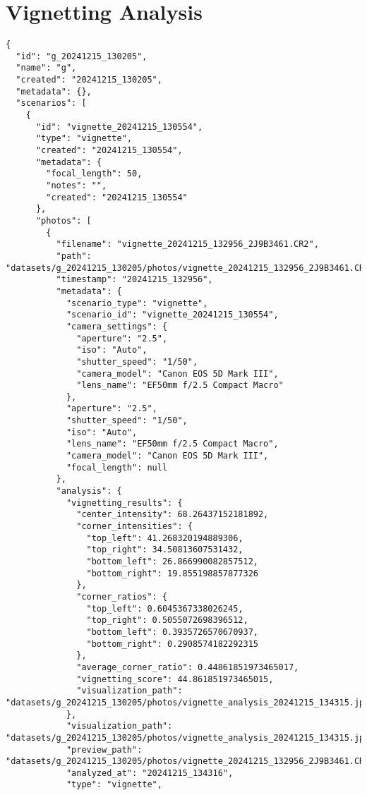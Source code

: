 \documentclass{book}
\begin{document}
\section{Vignetting Analysis}
\label{app:vignetting_json}
\begin{verbatim}
{
  "id": "g_20241215_130205",
  "name": "g",
  "created": "20241215_130205",
  "metadata": {},
  "scenarios": [
    {
      "id": "vignette_20241215_130554",
      "type": "vignette",
      "created": "20241215_130554",
      "metadata": {
        "focal_length": 50,
        "notes": "",
        "created": "20241215_130554"
      },
      "photos": [
        {
          "filename": "vignette_20241215_132956_2J9B3461.CR2",
          "path": "datasets/g_20241215_130205/photos/vignette_20241215_132956_2J9B3461.CR2",
          "timestamp": "20241215_132956",
          "metadata": {
            "scenario_type": "vignette",
            "scenario_id": "vignette_20241215_130554",
            "camera_settings": {
              "aperture": "2.5",
              "iso": "Auto",
              "shutter_speed": "1/50",
              "camera_model": "Canon EOS 5D Mark III",
              "lens_name": "EF50mm f/2.5 Compact Macro"
            },
            "aperture": "2.5",
            "shutter_speed": "1/50",
            "iso": "Auto",
            "lens_name": "EF50mm f/2.5 Compact Macro",
            "camera_model": "Canon EOS 5D Mark III",
            "focal_length": null
          },
          "analysis": {
            "vignetting_results": {
              "center_intensity": 68.26437152181892,
              "corner_intensities": {
                "top_left": 41.268320194889306,
                "top_right": 34.50813607531432,
                "bottom_left": 26.866990082857512,
                "bottom_right": 19.855198857877326
              },
              "corner_ratios": {
                "top_left": 0.6045367338026245,
                "top_right": 0.5055072698396512,
                "bottom_left": 0.3935726570670937,
                "bottom_right": 0.2908574182292315
              },
              "average_corner_ratio": 0.44861851973465017,
              "vignetting_score": 44.861851973465015,
              "visualization_path": "datasets/g_20241215_130205/photos/vignette_analysis_20241215_134315.jpg"
            },
            "visualization_path": "datasets/g_20241215_130205/photos/vignette_analysis_20241215_134315.jpg",
            "preview_path": "datasets/g_20241215_130205/photos/vignette_20241215_132956_2J9B3461.CR2",
            "analyzed_at": "20241215_134316",
            "type": "vignette",

\end{verbatim}
\end{document}
